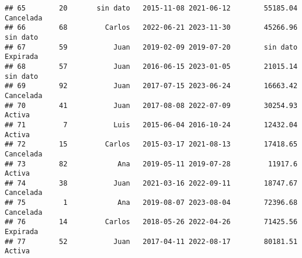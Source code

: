 \documentclass[
]{article}
\begin{document}
\begin{verbatim}
## 65        20       sin dato   2015-11-08 2021-06-12        55185.04 Cancelada
## 66        68         Carlos   2022-06-21 2023-11-30        45266.96  sin dato
## 67        59           Juan   2019-02-09 2019-07-20        sin dato  Expirada
## 68        57           Juan   2016-06-15 2023-01-05        21015.14  sin dato
## 69        92           Juan   2017-07-15 2023-06-24        16663.42 Cancelada
## 70        41           Juan   2017-08-08 2022-07-09        30254.93    Activa
## 71         7           Luis   2015-06-04 2016-10-24        12432.04    Activa
## 72        15         Carlos   2015-03-17 2021-08-13        17418.65 Cancelada
## 73        82            Ana   2019-05-11 2019-07-28         11917.6    Activa
## 74        38           Juan   2021-03-16 2022-09-11        18747.67 Cancelada
## 75         1            Ana   2019-08-07 2023-08-04        72396.68 Cancelada
## 76        14         Carlos   2018-05-26 2022-04-26        71425.56  Expirada
## 77        52           Juan   2017-04-11 2022-08-17        80181.51    Activa
\end{verbatim}
\end{document}
